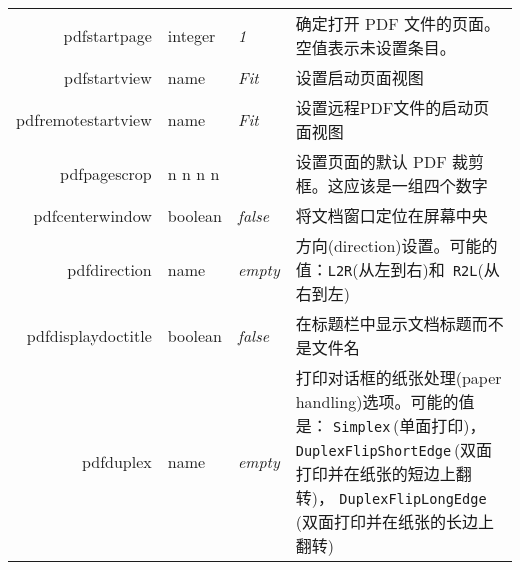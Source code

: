 \documentclass{article}
\begin{document}
\begin{longtable}{@{}>{\ttfamily}r>{\raggedright}p{}>{\itshape}lp{7cm}@{}}
pdfstartpage       & integer & 1     & 确定打开 PDF 文件的页面。空值表示未设置条目。\\
pdfstartview       & name    & Fit   & 设置启动页面视图 \\
pdfremotestartview & name    & Fit   & 设置远程PDF文件的启动页面视图 \\
pdfpagescrop       & n n n n &       & 设置页面的默认 PDF 裁剪框。这应该是一组四个数字 \\
pdfcenterwindow    & boolean & false & 将文档窗口定位在屏幕中央 \\
pdfdirection       & name    & empty & 方向(direction)设置。可能的值：\verb|L2R|(从左到右)和\verb| R2L|(从右到左)\\
pdfdisplaydoctitle & boolean & false & 在标题栏中显示文档标题而不是文件名\\
pdfduplex          & name    & empty & 打印对话框的纸张处理(paper handling)选项。可能的值是：
                                       \verb|Simplex|\,(单面打印)，
                                       \verb|DuplexFlipShortEdge|\,(双面打印并在纸张的短边上翻转)，
                                       \verb|DuplexFlipLongEdge|\,(双面打印并在纸张的长边上翻转)\\


\end{longtable}
\end{document}
